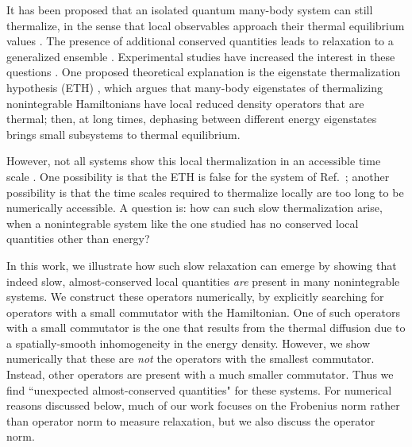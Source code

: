 \documentclass[twocolumn,superscriptaddress, prb]{revtex4-1}
\begin{document}
It has been proposed that an isolated quantum many-body system can still thermalize, in the sense that local observables approach their thermal equilibrium values \cite{Deutsch:1991,Srednicki:1994,Rigol:2008}.  The presence of additional conserved quantities leads to relaxation to a generalized ensemble \cite{Rigol:2007,Calabrese:2011,Gogolin:2011,Fagotti:2014}.  Experimental studies have increased the interest in these questions \cite{Polkovnikov:2011, Yukalov:2011}.  One proposed theoretical explanation is the eigenstate thermalization hypothesis (ETH) \cite{Deutsch:1991,Srednicki:1994,Rigol:2008,Santos:2010,Rigol:2012,Kruczenski:2013,Beugeling:2014,Sorg:2014,Kim_ETH,Goldstein:2014}, which argues that many-body eigenstates of thermalizing nonintegrable Hamiltonians have local reduced density operators that are thermal; then, at long times, dephasing between different energy eigenstates brings small subsystems to thermal equilibrium.

However, not all systems show this local thermalization in an accessible time scale \cite{Banuls:2011}.
One possibility is that the ETH is false for the system of Ref.~; another possibility is that the time scales required to thermalize locally are too long to be numerically accessible.  A question is: how can such slow thermalization arise, when a nonintegrable system like the one studied has no conserved local quantities other than energy?

In this work, we illustrate how such slow relaxation can emerge by showing that indeed slow, almost-conserved local quantities {\it are} present in many nonintegrable systems.  We construct these operators numerically, by explicitly searching for operators with a small commutator with the Hamiltonian.
One of such operators with a small commutator is the one that results from the thermal diffusion due to a spatially-smooth inhomogeneity in the energy density.  However, we show numerically that these are {\it not} the operators with the smallest commutator.  Instead, other operators are present with a much smaller commutator.  Thus we find ``unexpected almost-conserved quantities" for these systems.  For numerical reasons discussed below, much of our work focuses on the Frobenius norm rather than operator norm to measure relaxation, but we also discuss the operator norm.
\end{document}
